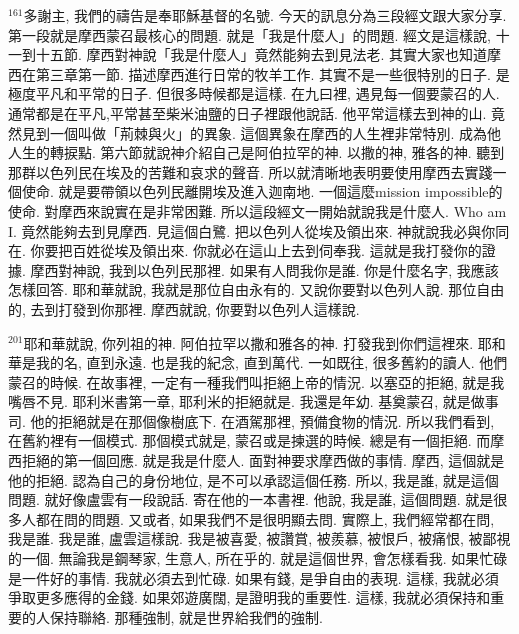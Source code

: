 \documentclass{book}
\begin{document}
$^{161}$多謝主, 我們的禱告是奉耶穌基督的名號.
今天的訊息分為三段經文跟大家分享.
第一段就是摩西蒙召最核心的問題.
就是「我是什麼人」的問題.
經文是這樣說, 十一到十五節.
摩西對神說「我是什麼人」竟然能夠去到見法老.
其實大家也知道摩西在第三章第一節.
描述摩西進行日常的牧羊工作.
其實不是一些很特別的日子.
是極度平凡和平常的日子.
但很多時候都是這樣.
在九曰裡, 遇見每一個要蒙召的人.
通常都是在平凡,平常甚至柴米油鹽的日子裡跟他說話.
他平常這樣去到神的山.
竟然見到一個叫做「荊棘與火」的異象.
這個異象在摩西的人生裡非常特別.
成為他人生的轉捩點.
第六節就說神介紹自己是阿伯拉罕的神.
以撒的神, 雅各的神.
聽到那群以色列民在埃及的苦難和哀求的聲音.
所以就清晰地表明要使用摩西去實踐一個使命.
就是要帶領以色列民離開埃及進入迦南地.
一個這麼mission impossible的使命.
對摩西來說實在是非常困難.
所以這段經文一開始就說我是什麼人.
Who am I.
竟然能夠去到見摩西.
見這個白鷺.
把以色列人從埃及領出來.
神就說我必與你同在.
你要把百姓從埃及領出來.
你就必在這山上去到伺奉我.
這就是我打發你的證據.
摩西對神說, 我到以色列民那裡.
如果有人問我你是誰.
你是什麼名字, 我應該怎樣回答.
耶和華就說, 我就是那位自由永有的.
又說你要對以色列人說.
那位自由的, 去到打發到你那裡.
摩西就說, 你要對以色列人這樣說.

$^{201}$耶和華就說, 你列祖的神.
阿伯拉罕以撒和雅各的神.
打發我到你們這裡來.
耶和華是我的名, 直到永遠.
也是我的紀念, 直到萬代.
一如既往, 很多舊約的讀人.
他們蒙召的時候.
在故事裡, 一定有一種我們叫拒絕上帝的情況.
以塞亞的拒絕, 就是我嘴唇不見.
耶利米書第一章, 耶利米的拒絕就是.
我還是年幼.
基奠蒙召, 就是做事司.
他的拒絕就是在那個像樹底下.
在酒駕那裡, 預備食物的情況.
所以我們看到, 在舊約裡有一個模式.
那個模式就是, 蒙召或是揀選的時候.
總是有一個拒絕.
而摩西拒絕的第一個回應.
就是我是什麼人.
面對神要求摩西做的事情.
摩西, 這個就是他的拒絕.
認為自己的身份地位, 是不可以承認這個任務.
所以, 我是誰, 就是這個問題.
就好像盧雲有一段說話.
寄在他的一本書裡.
他說, 我是誰, 這個問題.
就是很多人都在問的問題.
又或者, 如果我們不是很明顯去問.
實際上, 我們經常都在問, 我是誰.
我是誰, 盧雲這樣說.
我是被喜愛, 被讚賞, 被羨慕, 被恨戶, 被痛恨, 被鄙視的一個.
無論我是鋼琴家, 生意人, 所在乎的.
就是這個世界, 會怎樣看我.
如果忙碌是一件好的事情.
我就必須去到忙碌.
如果有錢, 是爭自由的表現.
這樣, 我就必須爭取更多應得的金錢.
如果郊遊廣闊, 是證明我的重要性.
這樣, 我就必須保持和重要的人保持聯絡.
那種強制, 就是世界給我們的強制.
\end{document}
